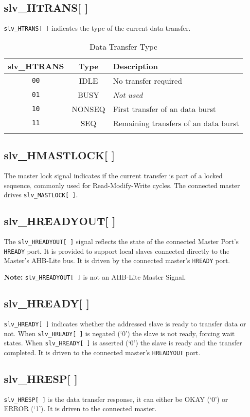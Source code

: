 \subsection{slv\_HTRANS[ ]}\label{slv_htrans}

\texttt{slv\_HTRANS[\,]} indicates the type of the current data transfer.

\begin{longtable}[]{@{}ccl@{}}
\toprule
slv\_HTRANS & Type & Description\tabularnewline
\midrule
\endhead
\texttt{00} & IDLE & No transfer required\tabularnewline
\texttt{01} & BUSY & \emph{Not used}\tabularnewline
\texttt{10} & NONSEQ & First transfer of an data burst\tabularnewline
\texttt{11} & SEQ & Remaining transfers of an data burst\tabularnewline
\bottomrule
\caption{Data Transfer Type}
\end{longtable}

\subsection{slv\_HMASTLOCK[ ]}\label{slv_hmastlock}

The master lock signal indicates if the current transfer is part of a
locked sequence, commonly used for Read-Modify-Write cycles. The
connected master drives \texttt{slv\_MASTLOCK[\,]}.

\subsection{slv\_HREADYOUT[ ]}\label{slv_hreadyout}

The \texttt{slv\_HREADYOUT[\,]} signal reflects the state of the connected Master
Port's \texttt{HREADY} port. It is provided to support local slaves connected
directly to the Master's AHB-Lite bus. It is driven by the connected
master's \texttt{HREADY} port.

\textbf{Note:} \texttt{slv\_HREADYOUT[\,]} is not an AHB-Lite Master Signal.

\subsection{slv\_HREADY[ ]}\label{slv_hready}

\texttt{slv\_HREADY[\,]} indicates whether the addressed slave is ready to transfer
data or not. When \texttt{slv\_HREADY[\,]} is negated (`0') the slave is not ready,
forcing wait states. When \texttt{slv\_HREADY[\,]} is asserted (`0') the slave is
ready and the transfer completed. It is driven to the connected master's
\texttt{HREADYOUT} port.

\subsection{slv\_HRESP[ ]}\label{slv_hresp}

\texttt{slv\_HRESP[\,]} is the data transfer response, it can either be OKAY (`0') or
ERROR (`1'). It is driven to the connected master.
